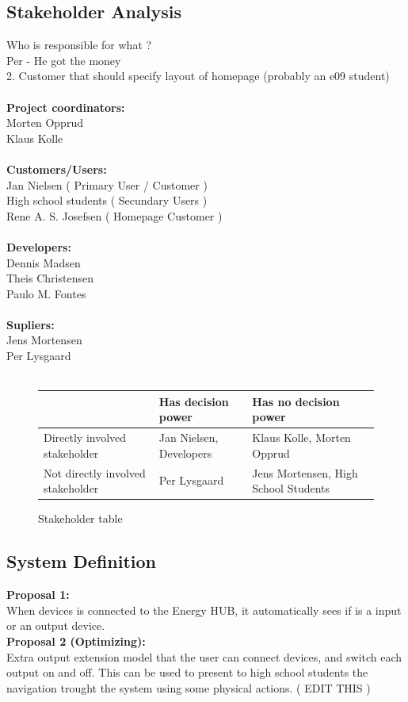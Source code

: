 \subsection{Stakeholder Analysis}
Who is responsible for what ?\\
Per - He got the money\\
2. Customer that should specify layout of homepage (probably an e09 student)\\
\\
\textbf{Project coordinators:}\\
Morten Opprud\\
Klaus Kolle\\
\\
\textbf{Customers/Users:}\\
Jan Nielsen ( Primary User / Customer )\\
High school students ( Secundary Users )\\
Rene A. S. Josefsen ( Homepage Customer )\\
\\
\textbf{Developers:}\\
Dennis Madsen\\
Theis Christensen\\
Paulo M. Fontes\\
\\
\textbf{Supliers:}\\
Jens Mortensen\\
Per Lysgaard\\
\\

\begin{figure}[h!]
 \begin{centering}
  \begin{tabular}{| l | l | l | }
   \hline
      & Has decision power & Has no decision power \\ \hline
    Directly involved stakeholder & Jan Nielsen, Developers & Klaus Kolle,
    Morten Opprud\\ \hline Not directly involved stakeholder & Per Lysgaard & Jens Mortensen, High School Students \\
    \hline
   \end{tabular}
  \end{centering}
 \caption{Stakeholder table}
\end{figure}

\subsection{System Definition}
\textbf{Proposal 1:}\\	
When devices is connected to the Energy HUB, it automatically sees if is a input
or an output device.
\\\textbf{Proposal 2 (Optimizing):}\\
Extra output extension model that the user can connect devices, and switch
each output on and off. This can be used to present to high school students
the navigation trought the system using some physical actions. ( EDIT THIS )\\
\\ 
